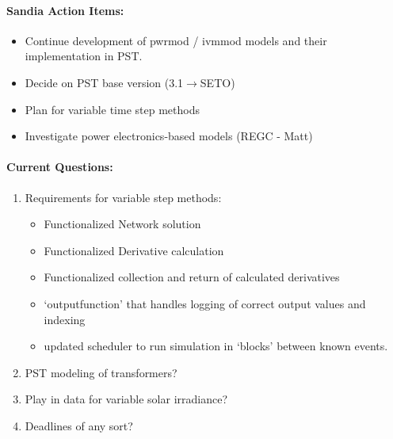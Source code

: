 \documentclass[12pt]{article}
\begin{document}
\begin{multicols}{2}
\paragraph{Sandia Action Items:}
	\begin{itemize}
		\itemsep 0em 
			\item Continue development of pwrmod / ivmmod models and their implementation in PST.
			\item Decide on PST base version (3.1$\longrightarrow$SETO)
			\item Plan for variable time step methods
			\item Investigate power electronics-based models (REGC - Matt)
	\end{itemize}
	
\paragraph{Current Questions:}
	\begin{enumerate}
	\itemsep0em 
	\item Requirements for variable step methods:
		\begin{minipage}{\linewidth}
			\begin{itemize}
				\itemsep0em 
				\footnotesize
				\item Functionalized Network solution
				\item Functionalized Derivative calculation
				\item Functionalized collection and return of calculated derivatives
				\item `outputfunction' that handles logging of correct output values and indexing
				\item updated scheduler to run simulation in `blocks' between known events.
			\end{itemize}
		\end{minipage}
	\item PST modeling of transformers?
	\item Play in data for variable solar irradiance?
	\item Deadlines of any sort?
	\end{enumerate}

\vfill\null
\columnbreak

	

\end{multicols}
\end{document}
